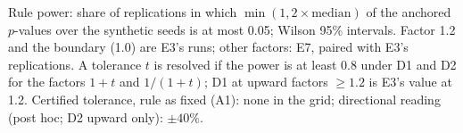 Rule power: share of replications in which $\min(1, 2\times\mathrm{median})$ of the anchored $p$-values over the synthetic seeds is at most 0.05; Wilson 95\% intervals. Factor 1.2 and the boundary (1.0) are E3's runs; other factors: E7, paired with E3's replications. A tolerance $t$ is resolved if the power is at least 0.8 under D1 and D2 for the factors $1+t$ and $1/(1+t)$; D1 at upward factors $\ge 1.2$ is E3's value at 1.2. Certified tolerance, rule as fixed (A1): none in the grid; directional reading (post hoc; D2 upward only): $\pm40\%$.
